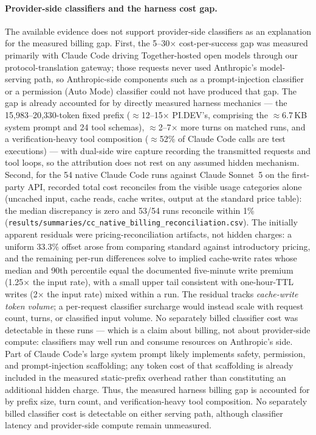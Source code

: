 \documentclass[11pt]{article}
\newcommand{\pidev}{PI.DEV}
\newcommand{\cc}{Claude Code}
\newcommand{\xd}{$\times$}
\begin{document}
\paragraph{Provider-side classifiers and the harness cost gap.} The available
evidence does not support provider-side classifiers as an explanation for
the measured billing gap. First, the 5--30\xd{} cost-per-success
gap was measured primarily with \cc{} driving Together-hosted open models
through our protocol-translation gateway; those requests never used
Anthropic's model-serving path, so Anthropic-side components such as a
prompt-injection classifier or a permission (Auto Mode) classifier could
not have produced that gap. The gap is already accounted for by directly
measured harness mechanics --- the 15{,}983--20{,}330-token fixed prefix
($\approx$12--15\xd{} \pidev's, comprising the $\approx$6.7\,KB system
prompt and 24 tool schemas), $\approx$2--7\xd{} more turns on matched
runs, and a verification-heavy tool composition ($\approx$52\% of \cc{}
calls are test executions) --- with dual-side wire capture recording the
transmitted requests and tool loops, so the attribution does not rest on
any assumed hidden mechanism. Second, for the 54 native \cc{} runs against
Claude Sonnet~5 on the first-party API, recorded total cost reconciles
from the visible usage categories alone (uncached input, cache reads,
cache writes, output at the standard price table): the median discrepancy
is zero and 53/54 runs reconcile within 1\%
(\texttt{results/summaries/cc\_native\_billing\_reconciliation.csv}).
The initially apparent residuals were pricing-reconciliation artifacts,
not hidden charges: a uniform 33.3\% offset arose from comparing standard
against introductory pricing, and the remaining per-run differences solve
to implied cache-write rates whose median and 90th percentile equal the
documented five-minute write premium (1.25\xd{} the input rate), with a small
upper tail consistent with one-hour-TTL writes (2\xd{} the input rate)
mixed within a run. The residual tracks \emph{cache-write token volume}; a per-request classifier surcharge would instead scale
with request count, turns, or classified input volume. No separately
billed classifier cost was detectable in these runs --- which is a claim
about billing, not about provider-side compute: classifiers may well run
and consume resources on Anthropic's side. Part of \cc{}'s large system
prompt likely implements safety, permission, and prompt-injection
scaffolding; any token cost of that scaffolding is already included in
the measured static-prefix overhead rather than constituting an
additional hidden charge. Thus, the measured harness billing gap is accounted for by prefix size,
turn count, and verification-heavy tool composition. No separately billed
classifier cost is detectable on either serving path, although classifier
latency and provider-side compute remain unmeasured.
\end{document}
